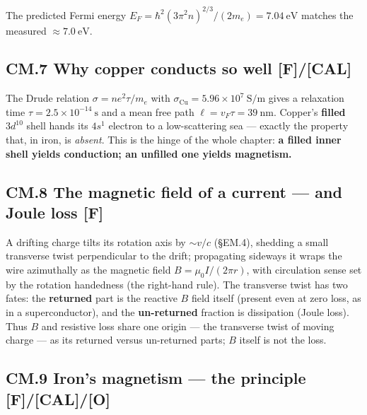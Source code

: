 \documentclass[
  10pt,
]{article}
\begin{document}
The predicted Fermi energy
\(E_F = \hbar^2(3\pi^2 n)^{2/3}/(2m_e) = 7.04\ \mathrm{eV}\) matches the
measured \(\approx 7.0\ \mathrm{eV}\).

\hypertarget{cm.7-why-copper-conducts-so-well-fcal}{%
\subsection{\texorpdfstring{CM.7 Why copper conducts so well
\textbf{{[}F{]}/{[}CAL{]}}}{CM.7 Why copper conducts so well {[}F{]}/{[}CAL{]}}}\label{cm.7-why-copper-conducts-so-well-fcal}}

The Drude relation \(\sigma = ne^2\tau/m_e\) with
\(\sigma_{\mathrm{Cu}} = 5.96\times 10^7\ \mathrm{S/m}\) gives a
relaxation time \(\tau = 2.5\times 10^{-14}\ \mathrm{s}\) and a mean
free path \(\ell = v_F\tau = 39\ \mathrm{nm}\). Copper's \textbf{filled}
\(3d^{10}\) shell hands its \(4s^1\) electron to a low-scattering sea
--- exactly the property that, in iron, is \emph{absent}. This is the
hinge of the whole chapter: \textbf{a filled inner shell yields
conduction; an unfilled one yields magnetism.}

\hypertarget{cm.8-the-magnetic-field-of-a-current-and-joule-loss-f}{%
\subsection{\texorpdfstring{CM.8 The magnetic field of a current --- and
Joule loss
\textbf{{[}F{]}}}{CM.8 The magnetic field of a current --- and Joule loss {[}F{]}}}\label{cm.8-the-magnetic-field-of-a-current-and-joule-loss-f}}

A drifting charge tilts its rotation axis by \(\sim v/c\) (§EM.4),
shedding a small transverse twist perpendicular to the drift;
propagating sideways it wraps the wire azimuthally as the magnetic field
\(B = \mu_0 I/(2\pi r)\), with circulation sense set by the rotation
handedness (the right-hand rule). The transverse twist has two fates:
the \textbf{returned} part is the reactive \(B\) field itself (present
even at zero loss, as in a superconductor), and the \textbf{un-returned}
fraction is dissipation (Joule loss). Thus \(B\) and resistive loss
share one origin --- the transverse twist of moving charge --- as its
returned versus un-returned parts; \(B\) itself is not the loss.

\hypertarget{cm.9-irons-magnetism-the-principle-fcalo}{%
\subsection{\texorpdfstring{CM.9 Iron's magnetism --- the principle
\textbf{{[}F{]}/{[}CAL{]}/{[}O{]}}}{CM.9 Iron's magnetism --- the principle {[}F{]}/{[}CAL{]}/{[}O{]}}}\label{cm.9-irons-magnetism-the-principle-fcalo}}
\end{document}
